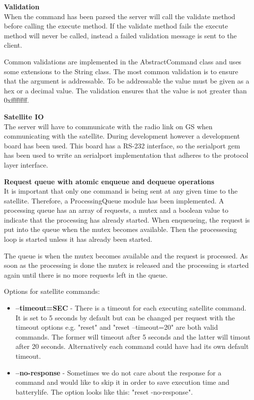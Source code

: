 \textbf{Validation} \\
When the command has been parsed the server will call the validate method before calling the execute method. If the validate method fails the execute method will never be called, instead a failed validation message is sent to the client.

Common validations are implemented in the AbstractCommand class and uses some extensions to the String class. The most common validation is to ensure that the argument is addressable. To be addressable the value must be given as a hex or a decimal value. The validation ensures that the value is not greater than 0xffffffff.

\textbf{Satellite IO} \\
The server will have to communicate with the radio link on GS when communicating with the satellite. During development however a development board has been used. This board has a RS-232 interface, so the serialport gem has been used to write an serialport implementation that adheres to the protocol layer interface.

\textbf{Request queue with atomic enqueue and dequeue operations} \\
It is important that only one command is being sent at any given time to the satellite. Therefore, a ProcessingQueue module has been implemented. A processing queue has an array of requests, a mutex and a boolean value to indicate that the processing has already started. When enqueueing, the request is put into the queue when the mutex becomes available. Then the processesing loop is started unless it has already been started.

The queue is when the mutex becomes available and the request is processed. As soon as the processing is done the mutex is released and the processing is started again until there is no more requests left in the queue.

Options for satellite commands:
\begin{itemize}
	\item \textbf{--timeout=SEC} - There is a timeout for each executing satellite command. It is set to 5 seconds by default but can be changed per request with the timeout options e.g. "reset" and "reset --timeout=20" are both valid commands. The former will timeout after 5 seconds and the latter will timout after 20 seconds. Alternatively each command could have had its own default timeout.
	\item \textbf{--no-response} - Sometimes we do not care about the response for a command and would like to skip it in order to save execution time and batterylife. The option looks like this: "reset -no-response".
\end{itemize}


